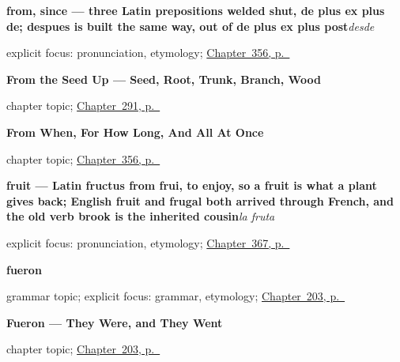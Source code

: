 \noindent\begin{minipage}[t]{\linewidth}
\raggedright
\textbf{from, since — three Latin prepositions welded shut, de plus ex plus de; despues is built the same way, out of de plus ex plus post}\enspace\emph{desde}\par
\footnotesize explicit focus: pronunciation, etymology; \hyperref[ch:desde-y-de-repente]{Chapter~356, p.~\pageref*{ch:desde-y-de-repente}}
\end{minipage}\par\smallskip

\noindent\begin{minipage}[t]{\linewidth}
\raggedright
\textbf{From the Seed Up --- Seed, Root, Trunk, Branch, Wood}\par
\footnotesize chapter topic; \hyperref[ch:de-la-semilla]{Chapter~291, p.~\pageref*{ch:de-la-semilla}}
\end{minipage}\par\smallskip

\noindent\begin{minipage}[t]{\linewidth}
\raggedright
\textbf{From When, For How Long, And All At Once}\par
\footnotesize chapter topic; \hyperref[ch:desde-y-de-repente]{Chapter~356, p.~\pageref*{ch:desde-y-de-repente}}
\end{minipage}\par\smallskip

\noindent\begin{minipage}[t]{\linewidth}
\raggedright
\textbf{fruit — Latin fructus from frui, to enjoy, so a fruit is what a plant gives back; English fruit and frugal both arrived through French, and the old verb brook is the inherited cousin}\enspace\emph{la fruta}\par
\footnotesize explicit focus: pronunciation, etymology; \hyperref[ch:el-desayuno-y-la-fruta]{Chapter~367, p.~\pageref*{ch:el-desayuno-y-la-fruta}}
\end{minipage}\par\smallskip

\noindent\begin{minipage}[t]{\linewidth}
\raggedright
\textbf{fueron}\par
\footnotesize grammar topic; explicit focus: grammar, etymology; \hyperref[ch:fueron]{Chapter~203, p.~\pageref*{ch:fueron}}
\end{minipage}\par\smallskip

\noindent\begin{minipage}[t]{\linewidth}
\raggedright
\textbf{Fueron --- They Were, and They Went}\par
\footnotesize chapter topic; \hyperref[ch:fueron]{Chapter~203, p.~\pageref*{ch:fueron}}
\end{minipage}\par\smallskip

